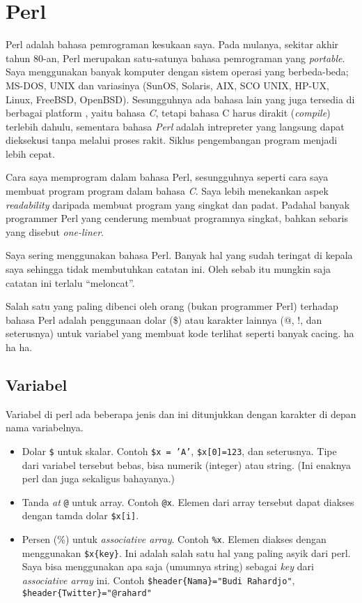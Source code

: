 \chapter{Perl}
Perl adalah bahasa pemrograman kesukaan saya.
Pada mulanya, sekitar akhir tahun 80-an, Perl merupakan 
satu-satunya bahasa pemrograman yang {\em portable}.
Saya menggunakan banyak komputer dengan sistem operasi yang
berbeda-beda; MS-DOS, UNIX dan variasinya (SunOS, Solaris, AIX,
SCO UNIX, HP-UX, Linux, FreeBSD, OpenBSD).
Sesungguhnya ada bahasa lain yang juga tersedia di berbagai
platform , yaitu bahasa {\em C}, tetapi bahasa C harus dirakit
({\em compile}) terlebih dahulu, sementara bahasa {\em Perl} 
adalah intrepreter yang langsung dapat dieksekusi tanpa melalui proses rakit.
Siklus pengembangan program menjadi lebih cepat.

Cara saya memprogram dalam bahasa Perl, sesungguhnya
seperti cara saya membuat program program dalam bahasa {\em C}.
Saya lebih menekankan aspek {\em readability} daripada
membuat program yang singkat dan padat.
Padahal banyak programmer Perl yang cenderung membuat programnya
singkat, bahkan sebaris yang disebut {\em one-liner}.

Saya sering menggunakan bahasa Perl. Banyak hal yang sudah teringat 
di kepala saya sehingga tidak membutuhkan catatan ini.
Oleh sebab itu mungkin saja catatan ini terlalu ``meloncat''.

Salah satu yang paling dibenci oleh orang (bukan programmer Perl)
terhadap bahasa Perl adalah penggunaan dolar (\$) atau karakter
lainnya (@, !, dan seterusnya) untuk variabel yang membuat kode terlihat
seperti banyak cacing. ha ha ha.

\section{Variabel}
Variabel di perl ada beberapa jenis dan ini ditunjukkan dengan
karakter di depan nama variabelnya.
\begin{itemize}
\item Dolar \texttt{\$} untuk skalar. Contoh \texttt{\$x = 'A'}, 
   \texttt{\$x[0]=123},
   dan seterusnya. Tipe dari variabel tersebut bebas,
   bisa numerik (integer) atau string.
   (Ini enaknya perl dan juga sekaligus bahayanya.)
\item Tanda {\em at} \texttt{@} untuk array. Contoh \texttt{@x}.
   Elemen dari array tersebut dapat diakses dengan 
   tamda dolar \texttt{\$x[i]}.
\item Persen (\%) untuk {\em associative array}. Contoh \texttt{\%x}.
   Elemen diakses dengan menggunakan \texttt{\$x\{key\}}.
   Ini adalah salah satu hal yang paling asyik dari perl.
   Saya bisa menggunakan apa saja (umumnya string) sebagai {\em key}
   dari {\em associative array} ini. Contoh 
   \texttt{\$header\{Nama\}="Budi Rahardjo"},
   \texttt{\$header\{Twitter\}="@rahard"}
\end{itemize}

